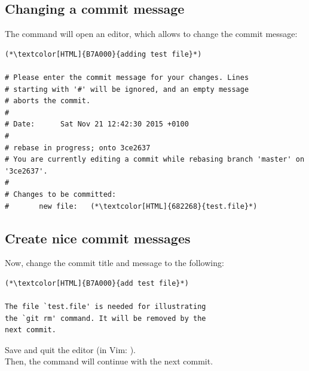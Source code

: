 \subsection{Changing a commit message}
\begin{frame}[fragile]
  \subslidetitle

  The  command will open an editor, which allows to change the commit message:
  \begin{lstlisting}
(*\textcolor[HTML]{B7A000}{adding test file}*)

# Please enter the commit message for your changes. Lines
# starting with '#' will be ignored, and an empty message
# aborts the commit.
#
# Date:      Sat Nov 21 12:42:30 2015 +0100
#
# rebase in progress; onto 3ce2637
# You are currently editing a commit while rebasing branch 'master' on '3ce2637'.
#
# Changes to be committed:
#       new file:   (*\textcolor[HTML]{682268}{test.file}*)
\end{lstlisting}

\end{frame}

\subsection{Create nice commit messages}
\begin{frame}[fragile]
  \subslidetitle

  Now, change the commit title and message to the following:
  \begin{lstlisting}
(*\textcolor[HTML]{B7A000}{add test file}*)

The file `test.file' is needed for illustrating
the `git rm' command. It will be removed by the
next commit.

\end{lstlisting}

  Save and quit the editor (in Vim: ).
  \\
  \vspace{1em}
  Then, the  command will continue with the next commit.
\end{frame}
